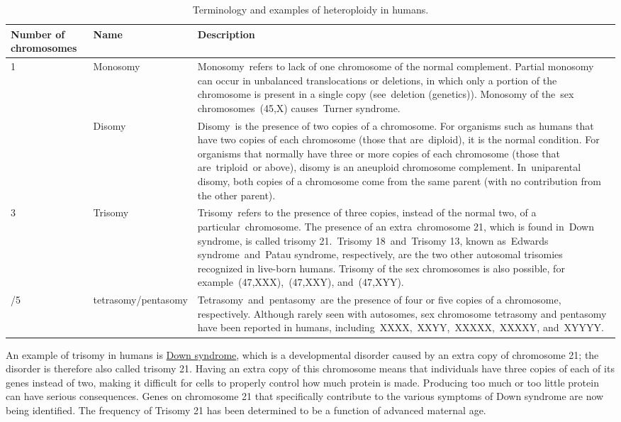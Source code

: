 \begin{longtable}[t]{>{\raggedright\arraybackslash}p{7em}>{\raggedright\arraybackslash}p{10em}>{\raggedright\arraybackslash}p{20em}}
\caption{\label{tab:heteroploidy}Terminology and examples of heteroploidy in humans.}\\
\toprule
Number of chromosomes & Name & Description\\
\midrule
\rowcolor{gray!6}  1 & Monosomy & Monosomy refers to lack of one chromosome of the normal complement. Partial monosomy can occur in unbalanced translocations or deletions, in which only a portion of the chromosome is present in a single copy (see deletion (genetics)). Monosomy of the sex chromosomes (45,X) causes Turner syndrome.\\
2 & Disomy & Disomy is the presence of two copies of a chromosome. For organisms such as humans that have two copies of each chromosome (those that are diploid), it is the normal condition. For organisms that normally have three or more copies of each chromosome (those that are triploid or above), disomy is an aneuploid chromosome complement. In uniparental disomy, both copies of a chromosome come from the same parent (with no contribution from the other parent).\\
\rowcolor{gray!6}  3 & Trisomy & Trisomy refers to the presence of three copies, instead of the normal two, of a particular chromosome. The presence of an extra chromosome 21, which is found in Down syndrome, is called trisomy 21. Trisomy 18 and Trisomy 13, known as Edwards syndrome and Patau syndrome, respectively, are the two other autosomal trisomies recognized in live-born humans. Trisomy of the sex chromosomes is also possible, for example (47,XXX), (47,XXY), and (47,XYY).\\
4/5 & tetrasomy/pentasomy & Tetrasomy and pentasomy are the presence of four or five copies of a chromosome, respectively. Although rarely seen with autosomes, sex chromosome tetrasomy and pentasomy have been reported in humans, including XXXX, XXYY, XXXXX, XXXXY, and XYYYY.\\
\bottomrule
\end{longtable}

An example of trisomy in humans is \href{https://en.wikipedia.org/wiki/Down_syndrome}{Down syndrome}, which is a developmental disorder caused by an extra copy of chromosome 21; the disorder is therefore also called trisomy 21. Having an extra copy of this chromosome means that individuals have three copies of each of its genes instead of two, making it difficult for cells to properly control how much protein is made. Producing too much or too little protein can have serious consequences. Genes on chromosome 21 that specifically contribute to the various symptoms of Down syndrome are now being identified. The frequency of Trisomy 21 has been determined to be a function of advanced maternal age.



